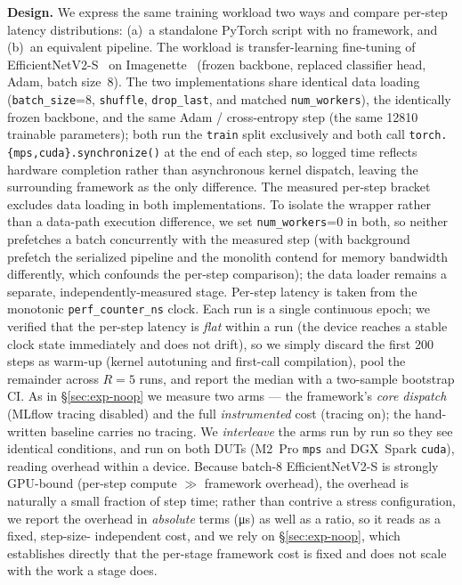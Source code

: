 \textbf{Design.} We express the same training workload two ways and compare
per-step latency distributions: (a)~a standalone PyTorch script with no
framework, and (b)~an equivalent \sysname{} pipeline. The workload is
transfer-learning fine-tuning of EfficientNetV2-S~\cite{tan2021efficientnetv2}
on Imagenette~\cite{imagenette} (frozen backbone, replaced classifier head,
Adam, batch size~8). The two implementations share identical data loading
(\texttt{batch\_size}=8, \texttt{shuffle}, \texttt{drop\_last}, and matched
\texttt{num\_workers}), the identically frozen backbone, and the same Adam /
cross-entropy step (the same \num{12810} trainable parameters); both run the
\texttt{train} split exclusively and both call
\texttt{torch.\{mps,cuda\}.synchronize()} at the end of each step, so logged time
reflects hardware completion rather than asynchronous kernel dispatch, leaving the
surrounding framework as the only difference. The measured per-step bracket
excludes data loading in both implementations. To isolate the wrapper rather than a
data-path execution difference, we set \texttt{num\_workers}=0 in both, so neither
prefetches a batch concurrently with the measured step (with background prefetch the
serialized pipeline and the monolith contend for memory bandwidth differently, which
confounds the per-step comparison); the \sysname{} data loader remains a separate,
independently-measured stage. Per-step latency is taken from the monotonic
\texttt{perf\_counter\_ns} clock. Each run is a single continuous epoch; we verified
that the per-step latency is \emph{flat} within a run (the device reaches a stable
clock state immediately and does not drift), so we simply discard the first
\num{200} steps as warm-up (kernel autotuning and first-call compilation), pool the
remainder across $R{=}5$ runs, and report the median with a two-sample bootstrap CI.
As in \S\ref{sec:exp-noop} we measure two arms --- the framework's \emph{core
dispatch} (MLflow tracing disabled) and the full \emph{instrumented} cost (tracing
on); the hand-written baseline carries no tracing. We \emph{interleave} the arms run
by run so they see identical conditions, and run on both DUTs (M2~Pro \texttt{mps}
and DGX~Spark \texttt{cuda}), reading overhead within a device. Because batch-8
EfficientNetV2-S is strongly GPU-bound (per-step compute $\gg$ framework
overhead), the overhead is naturally a small fraction of step time; rather than
contrive a stress configuration, we report the overhead in \emph{absolute} terms
(\si{\micro\second}) as well as a ratio, so it reads as a fixed, step-size-%
independent cost, and we rely on \S\ref{sec:exp-noop}, which establishes directly
that the per-stage framework cost is fixed and does not scale with the work a
stage does.

